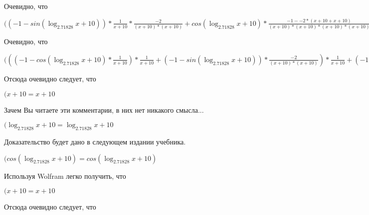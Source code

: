\documentclass[12pt,a4paper,fleqn]{article}
\theoremstyle{definition}
\begin{document}
Очевидно, что

$(( -1  - sin(\log_{ 2.71828 }{ x  +  10 })) * \frac{ 1 }{ x  +  10 }
 * \frac{ -2 }{( x  +  10 ) * ( x  +  10 )}
 + cos(\log_{ 2.71828 }{ x  +  10 }) * \frac{ -1  -  -2  * ( x  +  10  +  x  +  10 )}{( x  +  10 ) * ( x  +  10 ) * ( x  +  10 ) * ( x  +  10 )}
 = ( -1  - sin(\log_{ 2.71828 }{ x  +  10 })) * \frac{ 1 }{ x  +  10 }
 * \frac{ -2 }{( x  +  10 ) * ( x  +  10 )}
 + cos(\log_{ 2.71828 }{ x  +  10 }) * \frac{ -1  -  -2  * ( x  +  10  +  x  +  10 )}{( x  +  10 ) * ( x  +  10 ) * ( x  +  10 ) * ( x  +  10 )}
$

Очевидно, что

$((( -1  - cos(\log_{ 2.71828 }{ x  +  10 }) * \frac{ 1 }{ x  +  10 }
) * \frac{ 1 }{ x  +  10 }
 + ( -1  - sin(\log_{ 2.71828 }{ x  +  10 })) * \frac{ -2 }{( x  +  10 ) * ( x  +  10 )}
) * \frac{ 1 }{ x  +  10 }
 + ( -1  - sin(\log_{ 2.71828 }{ x  +  10 })) * \frac{ 1 }{ x  +  10 }
 * \frac{ -2 }{( x  +  10 ) * ( x  +  10 )}
 + ( -1  - sin(\log_{ 2.71828 }{ x  +  10 })) * \frac{ 1 }{ x  +  10 }
 * \frac{ -2 }{( x  +  10 ) * ( x  +  10 )}
 + cos(\log_{ 2.71828 }{ x  +  10 }) * \frac{ -1  -  -2  * ( x  +  10  +  x  +  10 )}{( x  +  10 ) * ( x  +  10 ) * ( x  +  10 ) * ( x  +  10 )}
 = (( -1  - cos(\log_{ 2.71828 }{ x  +  10 }) * \frac{ 1 }{ x  +  10 }
) * \frac{ 1 }{ x  +  10 }
 + ( -1  - sin(\log_{ 2.71828 }{ x  +  10 })) * \frac{ -2 }{( x  +  10 ) * ( x  +  10 )}
) * \frac{ 1 }{ x  +  10 }
 + ( -1  - sin(\log_{ 2.71828 }{ x  +  10 })) * \frac{ 1 }{ x  +  10 }
 * \frac{ -2 }{( x  +  10 ) * ( x  +  10 )}
 + ( -1  - sin(\log_{ 2.71828 }{ x  +  10 })) * \frac{ 1 }{ x  +  10 }
 * \frac{ -2 }{( x  +  10 ) * ( x  +  10 )}
 + cos(\log_{ 2.71828 }{ x  +  10 }) * \frac{ -1  -  -2  * ( x  +  10  +  x  +  10 )}{( x  +  10 ) * ( x  +  10 ) * ( x  +  10 ) * ( x  +  10 )}
$

Отсюда очевидно следует, что

$( x  +  10  =  x  +  10 $

Зачем Вы читаете эти комментарии, в них нет никакого смысла...

$(\log_{ 2.71828 }{ x  +  10 } = \log_{ 2.71828 }{ x  +  10 }$

Доказательство будет дано в следующем издании учебника.

$(cos(\log_{ 2.71828 }{ x  +  10 }) = cos(\log_{ 2.71828 }{ x  +  10 })$

Используя Wolfram легко получить, что

$( x  +  10  =  x  +  10 $

Отсюда очевидно следует, что
\end{document}

